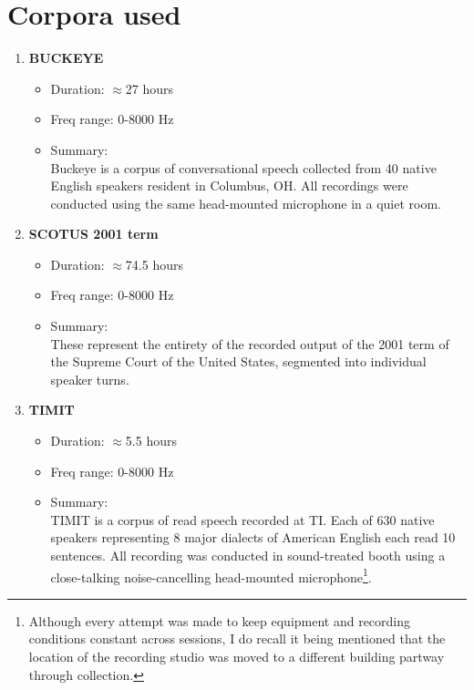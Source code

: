 \documentclass[12pt]{article}
\begin{document}
\section{Corpora used}
\begin{enumerate}
  \item {\bf BUCKEYE} \\
    \begin{itemize}
        \item Duration: $\approx$27 hours
        \item Freq range: 0-8000 Hz
        \item Summary: \\
          Buckeye is a corpus of conversational speech collected from 40 native English speakers resident in Columbus, OH. All recordings were conducted using the same head-mounted microphone in a quiet room.
    \end{itemize}

  \item {\bf SCOTUS 2001 term} \\
    \begin{itemize}
        \item Duration: $\approx$74.5 hours
        \item Freq range: 0-8000 Hz
        \item Summary: \\
          These represent the entirety of the recorded output of the 2001 term of the Supreme Court of the United States, segmented into individual speaker turns. 
    \end{itemize}


  \item {\bf TIMIT} \\
    \begin{itemize}
        \item Duration: $\approx$5.5 hours
        \item Freq range: 0-8000 Hz
        \item Summary:\\
          TIMIT is a corpus of read speech recorded at TI. Each of 630 native speakers representing 8 major dialects of American English each read 10 sentences. All recording was conducted in sound-treated booth using a close-talking noise-cancelling head-mounted microphone\footnote{Although every attempt was made to keep equipment and recording conditions constant across sessions, I do recall it being mentioned that the location of the recording studio was moved to a different building partway through collection.}.
    \end{itemize}


\end{enumerate}
\end{document}
